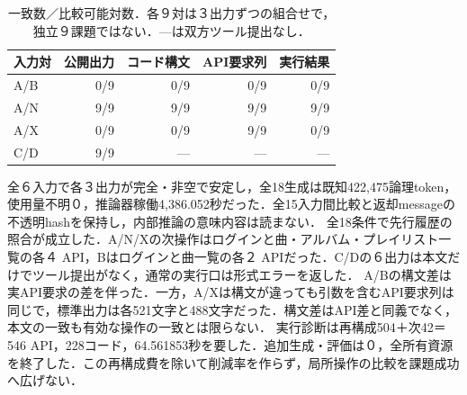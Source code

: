 \begin{table}[tb]
\centering\fontsize{8pt}{10pt}\selectfont\setlength{\tabcolsep}{3pt}
\caption{一致数／比較可能対数．各９対は３出力ずつの組合せで，独立９課題ではない．---は双方ツール提出なし．}
\begin{tabular}{lrrrr}
入力対 & 公開出力 & コード構文 & API要求列 & 実行結果 \\ \hline
A/B & 0/9 & 0/9 & 0/9 & 0/9 \\
A/N & 9/9 & 9/9 & 9/9 & 9/9 \\
A/X & 0/9 & 0/9 & 9/9 & 0/9 \\
C/D & 9/9 & --- & --- & --- \\
\hline\end{tabular}
\end{table}
全６入力で各３出力が完全・非空で安定し，全18生成は既知422,475論理token，使用量不明０，推論器稼働4,386.052秒だった．全15入力間比較と返却messageの不透明hashを保持し，内部推論の意味内容は読まない．
全18条件で先行履歴の照合が成立した．A/N/Xの次操作はログインと曲・アルバム・プレイリスト一覧の各４ API，Bはログインと曲一覧の各２ APIだった．C/Dの６出力は本文だけでツール提出がなく，通常の実行口は形式エラーを返した．
A/Bの構文差は実API要求の差を伴った．一方，A/Xは構文が違っても引数を含むAPI要求列は同じで，標準出力は各521文字と488文字だった．構文差はAPI差と同義でなく，本文の一致も有効な操作の一致とは限らない．
実行診断は再構成504＋次42＝546 API，228コード，64.561853秒を要した．追加生成・評価は０，全所有資源を終了した．この再構成費を除いて削減率を作らず，局所操作の比較を課題成功へ広げない．
